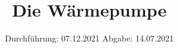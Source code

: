 

\subject{V206}
\title{Die Wärmepumpe}
\date{%
  Durchführung: 07.12.2021
  \hspace{3em}
  Abgabe: 14.07.2021
}



\maketitle
\thispagestyle{empty}
\tableofcontents
\newpage






\printbibliography{}


